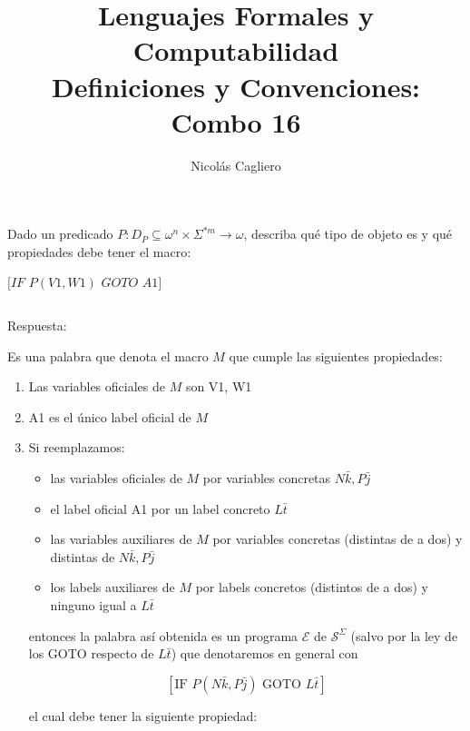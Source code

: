 \documentclass{article}
\title{Lenguajes Formales y Computabilidad \\
        \large Definiciones y Convenciones: Combo 16 }
\author{Nicolás Cagliero}
\begin{document}
\maketitle

Dado un predicado $P : D_P \subseteq \omega^n \times \Sigma^{*m} \rightarrow \omega$,
describa qué tipo de objeto es y qué propiedades debe tener el macro:
\begin{center}
    $[IF$ $P(V1, W1)$ $GOTO$ $A1]$
\end{center}

\(\)
\begin{center}
    Respuesta: 
    \(\)
\end{center}

Es una palabra que denota el macro $M$ que cumple las siguientes propiedades:
\begin{enumerate}
    \item Las variables oficiales de $M$ son V1, W1
    \item A1 es el único label oficial de $M$
    \item Si reemplazamos:
    \begin{itemize}
        \item las variables oficiales de $M$ por variables concretas $N \bar{k}, P \bar{j}$
        
        \item el label oficial A1 por un label concreto $L \bar{t}$
        
        \item las variables auxiliares de $M$ por variables concretas (distintas de a dos) y distintas de $N \bar{k}, P \bar{j}$
        
        \item los labels auxiliares de $M$ por labels concretos (distintos de a dos) y ninguno igual a $L \bar{t}$
    \end{itemize}
    entonces la palabra así obtenida es un programa $\mathcal{E}$ de $\mathcal{S}^{\Sigma}$ (salvo por la ley de los GOTO respecto de $L \bar{t}$) que denotaremos en general con

    \[
    [\text{IF } P(N \bar{k}, P \bar{j}) \text{ GOTO } L \bar{t}]
    \]

    el cual debe tener la siguiente propiedad:


\end{enumerate}
\end{document}
